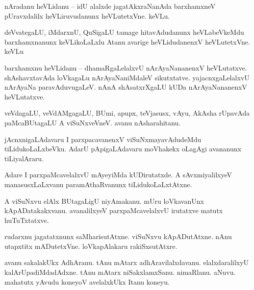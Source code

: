 \documentclass{article}
\begin{document}
\begin{mn}%
nAradanu heVLidanu -- idU alalxde jagatAkxraNanAda barxhamxneV pUravxdalilx heVLiruvudanunx 
heVLutetxVne. keVLu.
\end{mn}

\begin{mn}%
deVvategaLU, iMdarxnU, QuSigaLU tamage hitavAdudanunx heVLabeVkeMdu barxhamxnanunx keVLikoLaLxlu 
Atanu avarige heVLidudanenxV heVLutetxVne. keVLu
\end{mn}

\begin{mn}%
barxhamxnu heVLidanu -- dhamaRgaLelalxvU nArAyaNananenxV heVLutatxve. shAshavxtavAda loVkagaLu 
nArAyaNaniMdaleV sikutxtatve. yajacnxgaLelalxvU nArAyaNa paravAduvugaLeV. nAnA shAsatxrXgaLU kUDa 
nArAyaNananenxV heVLutatxve.
\end{mn}

\begin{mn}%
veVdagaLU, veVdAMgagaLU, BUmi, apupx, teVjasusx, vAyu, AkAsha rUpavAda paMcaBUtagaLU A 
viSuNxveVneV. avanu nAsharahitanu.
\end{mn}

\begin{mn}%
jAcnxnigaLAdavaru I parxpacavanenxV viSuNxmayavAdudeMdu tiLidukoLaLxbeVku. AdarU pApigaLAdavaru 
moVhakekx oLagAgi avananunx tiLiyalAraru.
\end{mn}

\begin{mn}%
Adare I parxpaMcavelalxvU mAyeyiMda kUDirutatxde. A sAvxmiyalilxyeV manasusxLaLxvanu 
paramAthaRvanunx tiLidukoLaLxtAtxne.
\end{mn}

\begin{mn}%
A viSuNxvu elAlx BUtagaLigU niyAmakanu. mUru loVkavanUnx kApADatakakxvanu. avanalilxyeV 
parxpaMcavelalxvU irutatxve matutx huTuTxtatxve.
\end{mn}

\begin{mn}%
rudarxnu jagatatxnunx saMharisutAtxne. viSuNxvu kApADutAtxne. nAnu utapxtitx mADutetxVne. 
loVkapAlakaru rakiSxsutAtxre.
\end{mn}

\begin{mn}%
avanu sakalakUkx AdhAranu. tAnu mAtarx adhAravilalxdavanu. elalxdaralilxyU kalArUpadiMdadAdxne. 
tAnu mAtarx niSakxlamxSanu. nimaRlanu. aNuvu. mahatutx yAvudu koneyoV avelalxkUkx Itanu koneyu.
\end{mn}
\end{document}

